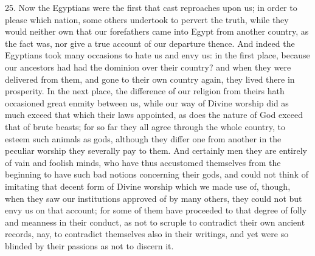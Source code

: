 25. Now the Egyptians were the first that cast reproaches upon us; in
order to please which nation, some others undertook to pervert the truth,
while they would neither own that our forefathers came into Egypt from
another country, as the fact was, nor give a true account of our departure
thence. And indeed the Egyptians took many occasions to hate us and envy
us: in the first place, because our ancestors had had the dominion over
their country? and when they were delivered from them, and gone to their
own country again, they lived there in prosperity. In the next place, the
difference of our religion from theirs hath occasioned great enmity
between us, while our way of Divine worship did as much exceed that which
their laws appointed, as does the nature of God exceed that of brute
beasts; for so far they all agree through the whole country, to esteem
such animals as gods, although they differ one from another in the
peculiar worship they severally pay to them. And certainly men they are
entirely of vain and foolish minds, who have thus accustomed themselves
from the beginning to have such bad notions concerning their gods, and
could not think of imitating that decent form of Divine worship which we
made use of, though, when they saw our institutions approved of by many
others, they could not but envy us on that account; for some of them have
proceeded to that degree of folly and meanness in their conduct, as not to
scruple to contradict their own ancient records, nay, to contradict
themselves also in their writings, and yet were so blinded by their
passions as not to discern it.

